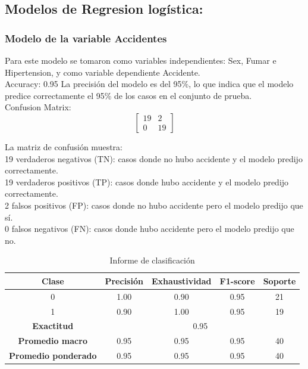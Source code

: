 \documentclass[a4paper, 12pt]{article}
\begin{document}
\newpage

\subsection{Modelos de Regresion logística:}

\subsubsection{Modelo de la variable Accidentes}

Para este modelo se tomaron como variables independientes: Sex, Fumar e Hipertension, y como
variable dependiente Accidente.
\\
Accuracy: 0.95
La precisión del modelo es del 95\%, lo que indica que el modelo 
predice correctamente el 95\% de los casos en el conjunto de prueba.
\\
Confusion Matrix:
\[
\begin{bmatrix}
19 & 2 \\
0 & 19
\end{bmatrix}\]

La matriz de confusión muestra:
\\
19 verdaderos negativos (TN): casos donde no hubo accidente y el modelo predijo correctamente.
\\
19 verdaderos positivos (TP): casos donde hubo accidente y el modelo predijo correctamente.
\\
2 falsos positivos (FP): casos donde no hubo accidente pero el modelo predijo que sí.
\\
0 falsos negativos (FN): casos donde hubo accidente pero el modelo predijo que no.

\begin{table}[H]
    \centering
    \begin{tabular}{|c|c|c|c|c|}
        \hline
        Clase & Precisión & Exhaustividad & F1-score & Soporte \\ \hline
        0 & 1.00 & 0.90 & 0.95 & 21 \\ \hline
        1 & 0.90 & 1.00 & 0.95 & 19 \\ \hline
        \textbf{Exactitud} & \multicolumn{4}{c|}{0.95} \\ \hline
        \textbf{Promedio macro} & 0.95 & 0.95 & 0.95 & 40 \\ \hline
        \textbf{Promedio ponderado} & 0.95 & 0.95 & 0.95 & 40 \\ \hline
    \end{tabular}
    \caption{Informe de clasificación}
    \label{tab:classification_report}
\end{table}
\end{document}
